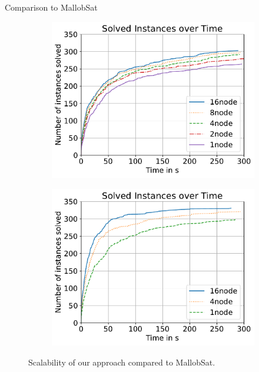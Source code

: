 \documentclass{beamer}
\begin{document}
\begin{frame}{Comparison to MallobSat}
    \begin{figure}[!h]
      \center
      \begin{subfigure}[c]{.4\textwidth}
        \center
        \includegraphics[scale=.3]{plots/cumulative_runtime/scalability_gim.pdf}
      \end{subfigure}
      \hfill
      \begin{subfigure}[c]{.4\textwidth}
        \center
        \includegraphics[scale=.3]{plots/cumulative_runtime/scalability_kis.pdf}
      \end{subfigure}
      \caption{Scalability of our approach compared to MallobSat.}
    \end{figure}
\end{frame}
\end{document}
